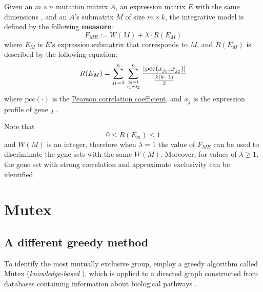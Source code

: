 \begin{definition}
    Given an $m \times n$ mutation matrix $A$, an expression matrix $E$ with the same dimensions , and an $A$'s submatrix $M$ of size $m \times k$, the integrative model is defined by the following \textbf{measure}: $$F_{ME} := W(M) + \lambda \cdot R(E_M)$$ where $E_M$ is $E$'s expression submatrix that corresponds to $M$, and $R(E_M)$ is described by the following equation: $$R(E_M) = \sum_{j_1 = 1}^n {\sum_{j_2 = 1 \atop j_1 \neq j_2} ^n {\dfrac{\left|\mathrm{pcc}(x_{j_1}, x_{j_2})\right|}{\frac{k(k - 1)}{2}}}}$$ where $\mathrm{pcc}(\cdot)$ is the \href{https://en.wikipedia.org/wiki/Pearson_correlation_coefficient}{Pearson correlation coefficient}, and $x_j$ is the expression profile of gene $j$ .
\end{definition}

Note that $$0 \le R(E_m) \le 1$$ and $W(M)$ is an integer, therefore when $\lambda = 1$ the value of $F_{ME}$ can be used to discriminate the gene sets with the same $W(M)$. Moreover, for values of $\lambda \ge 1$, the gene set with strong correlation and approximate exclusivity can be identified.

\section{Mutex}

\subsection{A different greedy method}

To identify the most mutually exclusive group, \textcite{mutex} employ a greedy algorithm called Mutex (\textit{knowledge-based} \cite{survey}), which is applied to a directed graph constructed from databases containing information about biological pathways .

